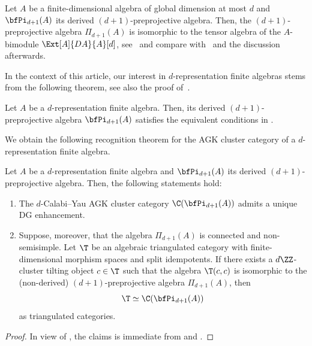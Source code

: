 \documentclass[a4paper]{amsart}
\begin{document}
\begin{remark}
  Let $A$ be a finite-dimensional algebra of global dimension at most $d$ and
  $\bfPi_{d+1}(A)$ its derived $(d+1)$-preprojective algebra. Then, the
  $(d+1)$-preprojective algebra $\Pi_{d+1}(A)$ is isomorphic to the tensor
  algebra of the $A$-bimodule $\Ext[A]{DA}{A}[d]$, see~\cite[Prop.~2.12]{IO11}
  and compare with~\cite[Lemma~2.7]{Guo11} and the discussion afterwards.
\end{remark}

In the context of this article, our interest in $d$-representation finite
 algebras stems from the following theorem, see also the proof
 of~\cite[Prop.~8.6]{CDIM20}.

\begin{theorem}
  \label{thm:IO-dRF_Pi}
  Let $A$ be a $d$-representation finite algebra. Then, its derived
  $(d+1)$-preprojective algebra $\bfPi_{d+1}(A)$ satisfies the equivalent
  conditions in .
\end{theorem}

We obtain the following recognition theorem for the AGK cluster category of a
$d$-representation finite algebra.

\begin{theorem}
  \label{thm:AGK_uniqueness-dRF}
  Let $A$ be a $d$-representation finite algebra and $\bfPi_{d+1}(A)$ its
  derived $(d+1)$-preprojective algebra. Then, the following statements hold:
  \begin{enumerate}
  \item The $d$-Calabi--Yau AGK cluster category $\C(\bfPi_{d+1}(A))$ admits a
    unique DG enhancement.
  \item Suppose, moreover, that the algebra $\Pi_{d+1}(A)$ is connected and
    non-semisimple. Let $\T$ be an algebraic triangulated category with finite-dimensional
    morphism spaces and split idempotents. If there exists a $d\ZZ$-cluster
    tilting object $c\in\T$ such that the algebra $\T(c,c)$ is isomorphic to the
    (non-derived) $(d+1)$-preprojective algebra $\Pi_{d+1}(A)$, then
    \[
      \T\simeq\C(\bfPi_{d+1}(A))
    \]
    as triangulated categories.
  \end{enumerate}  
\end{theorem}
\begin{proof}
  In view of , the claims is immediate from
   and .
\end{proof}
% 
\end{document}
